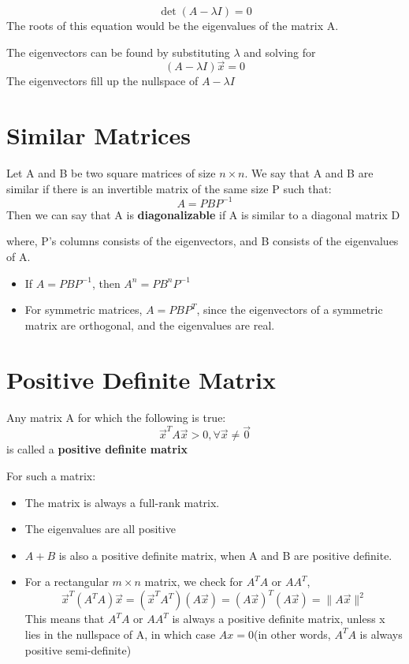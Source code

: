 \documentclass{report}
\begin{document}
\[
	\det(A- \lambda I) = 0
\]
The roots of this equation would be the eigenvalues of the matrix A. 

The eigenvectors can be found by substituting $\lambda$ and solving for 
\[
   (A - \lambda I)\vec{x} = 0
\]
The eigenvectors fill up the nullspace of $A - \lambda I$
\section{Similar Matrices}
\begin{definition}
	Let A and B be two square matrices of size $n \times n$. We say that A and B are similar if there is an invertible matrix of the same size P such that: 
	\[
	   A = PBP^{-1}
	\]
	Then we can say that A is \textbf{diagonalizable} if A is similar to a diagonal matrix D
\end{definition}
where, 
P's columns consists of the eigenvectors, and B consists of the eigenvalues of A.
\begin{note}
	\begin{itemize}
	\item If $A = PBP^{-1}$, then $A^n = PB^nP^{-1}$
	\item For symmetric matrices, $A = PBP^T$, since the eigenvectors of a symmetric matrix are orthogonal, and the eigenvalues are real.
	\end{itemize}
\end{note}
\section{Positive Definite Matrix}
\begin{definition}
Any matrix A for which the following is true:	
	\begin{displaymath}
   \vec{x}^T A\vec{x} > 0, \forall \vec{x} \neq \vec{0}
	\end{displaymath}
is called a \textbf{positive definite matrix}
\end{definition}
\pagebreak
For such a matrix: 
\begin{itemize}
	\item The matrix is always a full-rank matrix. 
	\item The eigenvalues are all positive
	\item $A+B$ is also a positive definite matrix, when A and B are positive definite. 
	\item For a rectangular $m \times n$ matrix, we check for $A^TA \text{ or } AA^T$, \[
	      \vec{x}^T(A^TA)\vec{x} = (\vec{x}^TA^T)(A\vec{x}) = (A\vec{x})^T(A\vec{x}) = \|{A\vec{x}}\|^2
	\]
	This means that $A^TA$ or $AA^T$ is always a positive definite matrix, unless x lies in the nullspace of A, in which case $Ax = 0$(in other words, $A^T A$ is always positive semi-definite)
\end{itemize}
\end{document}

